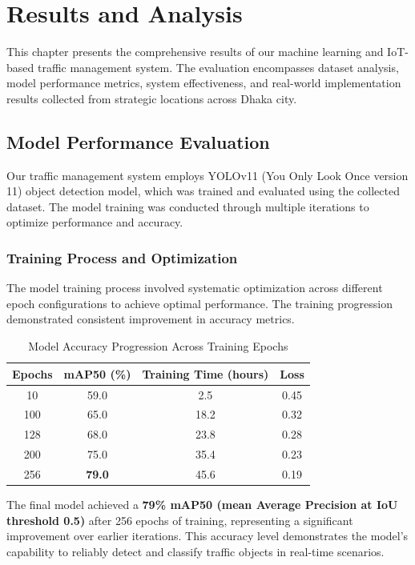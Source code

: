 \chapter{Results and Analysis}
\label{ch:results}

This chapter presents the comprehensive results of our machine learning and IoT-based traffic management system. The evaluation encompasses dataset analysis, model performance metrics, system effectiveness, and real-world implementation results collected from strategic locations across Dhaka city.



\section{Model Performance Evaluation}
\label{sec:model_performance}

Our traffic management system employs YOLOv11 (You Only Look Once version 11) object detection model, which was trained and evaluated using the collected dataset. The model training was conducted through multiple iterations to optimize performance and accuracy.

\subsection{Training Process and Optimization}
The model training process involved systematic optimization across different epoch configurations to achieve optimal performance. The training progression demonstrated consistent improvement in accuracy metrics.

\begin{table}[h]
\centering
\caption{Model Accuracy Progression Across Training Epochs}
\label{tab:model_accuracy}
\begin{tabular}{|c|c|c|c|}
\hline
\textbf{Epochs} & \textbf{mAP50 (\%)} & \textbf{Training Time (hours)} & \textbf{Loss} \\
\hline
10 & 59.0 & 2.5 & 0.45 \\
100 & 65.0 & 18.2 & 0.32 \\
128 & 68.0 & 23.8 & 0.28 \\
200 & 75.0 & 35.4 & 0.23 \\
256 & \textbf{79.0} & 45.6 & 0.19 \\
\hline
\end{tabular}
\end{table}

The final model achieved a \textbf{79\% mAP50 (mean Average Precision at IoU threshold 0.5)} after 256 epochs of training, representing a significant improvement over earlier iterations. This accuracy level demonstrates the model's capability to reliably detect and classify traffic objects in real-time scenarios.

